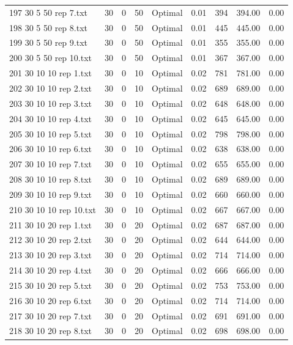 \begin{longtable}{lrrllrrrr}
197 30 5 50 rep 7.txt & 30 & 0 & 50 & Optimal &  0.01 & 394 & 394.00 &  0.00\\
198 30 5 50 rep 8.txt & 30 & 0 & 50 & Optimal &  0.01 & 445 & 445.00 &  0.00\\
199 30 5 50 rep 9.txt & 30 & 0 & 50 & Optimal &  0.01 & 355 & 355.00 &  0.00\\
200 30 5 50 rep 10.txt & 30 & 0 & 50 & Optimal &  0.01 & 367 & 367.00 &  0.00\\
201 30 10 10 rep 1.txt & 30 & 0 & 10 & Optimal &  0.02 & 781 & 781.00 &  0.00\\
202 30 10 10 rep 2.txt & 30 & 0 & 10 & Optimal &  0.02 & 689 & 689.00 &  0.00\\
203 30 10 10 rep 3.txt & 30 & 0 & 10 & Optimal &  0.02 & 648 & 648.00 &  0.00\\
204 30 10 10 rep 4.txt & 30 & 0 & 10 & Optimal &  0.02 & 645 & 645.00 &  0.00\\
205 30 10 10 rep 5.txt & 30 & 0 & 10 & Optimal &  0.02 & 798 & 798.00 &  0.00\\
206 30 10 10 rep 6.txt & 30 & 0 & 10 & Optimal &  0.02 & 638 & 638.00 &  0.00\\
207 30 10 10 rep 7.txt & 30 & 0 & 10 & Optimal &  0.02 & 655 & 655.00 &  0.00\\
208 30 10 10 rep 8.txt & 30 & 0 & 10 & Optimal &  0.02 & 689 & 689.00 &  0.00\\
209 30 10 10 rep 9.txt & 30 & 0 & 10 & Optimal &  0.02 & 660 & 660.00 &  0.00\\
210 30 10 10 rep 10.txt & 30 & 0 & 10 & Optimal &  0.02 & 667 & 667.00 &  0.00\\
211 30 10 20 rep 1.txt & 30 & 0 & 20 & Optimal &  0.02 & 687 & 687.00 &  0.00\\
212 30 10 20 rep 2.txt & 30 & 0 & 20 & Optimal &  0.02 & 644 & 644.00 &  0.00\\
213 30 10 20 rep 3.txt & 30 & 0 & 20 & Optimal &  0.02 & 714 & 714.00 &  0.00\\
214 30 10 20 rep 4.txt & 30 & 0 & 20 & Optimal &  0.02 & 666 & 666.00 &  0.00\\
215 30 10 20 rep 5.txt & 30 & 0 & 20 & Optimal &  0.02 & 753 & 753.00 &  0.00\\
216 30 10 20 rep 6.txt & 30 & 0 & 20 & Optimal &  0.02 & 714 & 714.00 &  0.00\\
217 30 10 20 rep 7.txt & 30 & 0 & 20 & Optimal &  0.02 & 691 & 691.00 &  0.00\\
218 30 10 20 rep 8.txt & 30 & 0 & 20 & Optimal &  0.02 & 698 & 698.00 &  0.00\\

\end{longtable}
